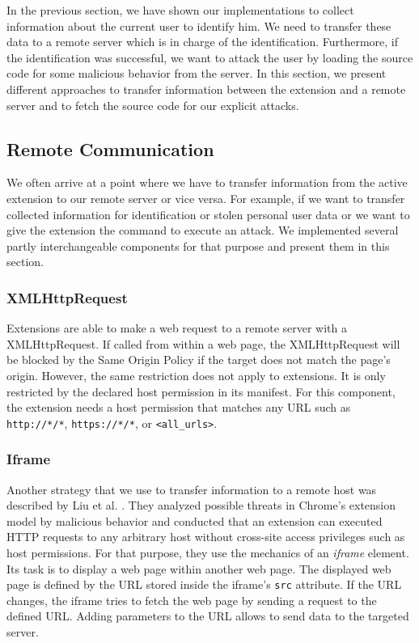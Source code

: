 	In the previous section, we have shown our implementations to collect information about the current user to identify him. We need to transfer these data to a remote server which is in charge of the identification. Furthermore, if the identification was successful, we want to attack the user by loading the source code for some malicious behavior from the server. In this section, we present different approaches to transfer information between the extension and a remote server and to fetch the source code for our explicit attacks.
	
\subsection{Remote Communication}
\label{sec:remoteCommunication}

	We often arrive at a point where we have to transfer information from the active extension to our remote server or vice versa. For example, if we want to transfer collected information for identification or stolen personal user data or we want to give the extension the command to execute an attack. We implemented several partly interchangeable components for that purpose and present them in this section.

\subsubsection{XMLHttpRequest}
\label{sec:xhrCommunication}

	Extensions are able to make a web request to a remote server with a XMLHttpRequest. If called from within a web page, the XMLHttpRequest will be blocked by the Same Origin Policy if the target does not match the page's origin. However, the same restriction does not apply to extensions. It is only restricted by the declared host permission in its manifest. For this component, the extension needs a host permission that matches any URL such as \texttt{http://*/*}, \texttt{https://*/*}, or \texttt{<all\_urls>}. 

\subsubsection{Iframe}
\label{sec:iframeCommunication}

	Another strategy that we use to transfer information to a remote host was described by Liu et al. \cite{Liu12chromeextensions:}. They analyzed possible threats in Chrome's extension model by malicious behavior and conducted that an extension can executed HTTP requests to any arbitrary host without cross-site access privileges such as host permissions. For that purpose, they use the mechanics of an \textit{iframe} element. Its task is to display a web page within another web page. The displayed web page is defined by the URL stored inside the iframe's \texttt{src} attribute. If the URL changes, the iframe tries to fetch the web page by sending a request to the defined URL. Adding parameters to the URL allows to send data to the targeted server. 

